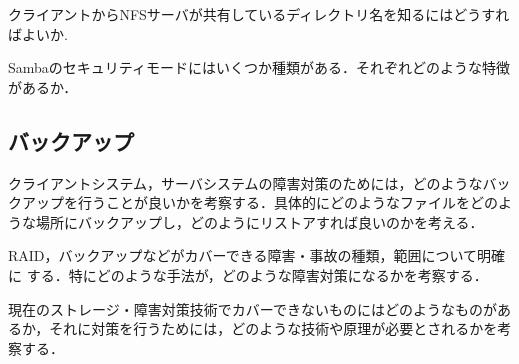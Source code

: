 クライアントからNFSサーバが共有しているディレクトリ名を知るにはどうすればよいか.

Sambaのセキュリティモードにはいくつか種類がある．それぞれどのような特徴があるか．


\subsection*{バックアップ}

クライアントシステム，サーバシステムの障害対策のためには，どのようなバッ
クアップを行うことが良いかを考察する．具体的にどのようなファイルをどのよ
うな場所にバックアップし，どのようにリストアすれば良いのかを考える．

RAID，バックアップなどがカバーできる障害・事故の種類，範囲について明確に
する．特にどのような手法が，どのような障害対策になるかを考察する．

現在のストレージ・障害対策技術でカバーできないものにはどのようなものがあ
るか，それに対策を行うためには，どのような技術や原理が必要とされるかを考
察する．

